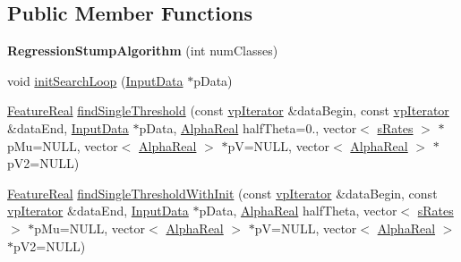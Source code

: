 \subsection*{Public Member Functions}
\begin{DoxyCompactItemize}
\item 
\hypertarget{classMultiBoost_1_1RegressionStumpAlgorithm_afcb914f8be9ebcf7470a0ec02747a4de}{{\bfseries Regression\-Stump\-Algorithm} (int num\-Classes)}\label{classMultiBoost_1_1RegressionStumpAlgorithm_afcb914f8be9ebcf7470a0ec02747a4de}

\item 
void \hyperlink{classMultiBoost_1_1RegressionStumpAlgorithm_a0703346e6573b6358bfaad06b7734bc8}{init\-Search\-Loop} (\hyperlink{classMultiBoost_1_1InputData}{Input\-Data} $\ast$p\-Data)
\item 
\hyperlink{Defaults_8h_a3a11cfe6a5d469d921716ca6291e934f}{Feature\-Real} \hyperlink{classMultiBoost_1_1RegressionStumpAlgorithm_aa28973e4e73b3e35af7e8d1277535eab}{find\-Single\-Threshold} (const \hyperlink{classMultiBoost_1_1RegressionStumpAlgorithm_a2b15b3238653298e01264e1d90f2ec0f}{vp\-Iterator} \&data\-Begin, const \hyperlink{classMultiBoost_1_1RegressionStumpAlgorithm_a2b15b3238653298e01264e1d90f2ec0f}{vp\-Iterator} \&data\-End, \hyperlink{classMultiBoost_1_1InputData}{Input\-Data} $\ast$p\-Data, \hyperlink{Defaults_8h_a80184c4fd10ab70a1a17c5f97dcd1563}{Alpha\-Real} half\-Theta=0., vector$<$ \hyperlink{structMultiBoost_1_1sRates}{s\-Rates} $>$ $\ast$p\-Mu=N\-U\-L\-L, vector$<$ \hyperlink{Defaults_8h_a80184c4fd10ab70a1a17c5f97dcd1563}{Alpha\-Real} $>$ $\ast$p\-V=N\-U\-L\-L, vector$<$ \hyperlink{Defaults_8h_a80184c4fd10ab70a1a17c5f97dcd1563}{Alpha\-Real} $>$ $\ast$p\-V2=N\-U\-L\-L)
\item 
\hyperlink{Defaults_8h_a3a11cfe6a5d469d921716ca6291e934f}{Feature\-Real} \hyperlink{classMultiBoost_1_1RegressionStumpAlgorithm_a1d066dfe97f50b019de6d2bcc78677b0}{find\-Single\-Threshold\-With\-Init} (const \hyperlink{classMultiBoost_1_1RegressionStumpAlgorithm_a2b15b3238653298e01264e1d90f2ec0f}{vp\-Iterator} \&data\-Begin, const \hyperlink{classMultiBoost_1_1RegressionStumpAlgorithm_a2b15b3238653298e01264e1d90f2ec0f}{vp\-Iterator} \&data\-End, \hyperlink{classMultiBoost_1_1InputData}{Input\-Data} $\ast$p\-Data, \hyperlink{Defaults_8h_a80184c4fd10ab70a1a17c5f97dcd1563}{Alpha\-Real} half\-Theta, vector$<$ \hyperlink{structMultiBoost_1_1sRates}{s\-Rates} $>$ $\ast$p\-Mu=N\-U\-L\-L, vector$<$ \hyperlink{Defaults_8h_a80184c4fd10ab70a1a17c5f97dcd1563}{Alpha\-Real} $>$ $\ast$p\-V=N\-U\-L\-L, vector$<$ \hyperlink{Defaults_8h_a80184c4fd10ab70a1a17c5f97dcd1563}{Alpha\-Real} $>$ $\ast$p\-V2=N\-U\-L\-L)

\end{DoxyCompactItemize}
